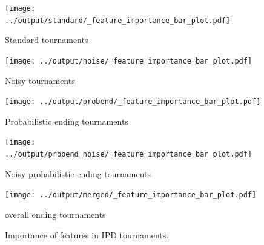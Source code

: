 \documentclass{article}
\begin{document}
\begin{figure}[!htbp]
    \begin{minipage}{0.5\textwidth}
        \begin{center}
            \texttt{[image: ../output/standard/\_feature\_importance\_bar\_plot.pdf]}
        \end{center}
        \caption{Standard tournaments}
    \end{minipage}\hspace{1cm}
    \begin{minipage}{0.5\textwidth}
        \begin{center}
            \texttt{[image: ../output/noise/\_feature\_importance\_bar\_plot.pdf]}
        \end{center}
        \caption{Noisy tournaments}
    \end{minipage}\hspace{1cm}
    \begin{minipage}{0.5\textwidth}
        \begin{center}
            \texttt{[image: ../output/probend/\_feature\_importance\_bar\_plot.pdf]}
        \end{center}
        \caption{Probabilistic ending tournaments}
    \end{minipage}\hspace{1cm}
    \begin{minipage}{0.5\textwidth}
        \begin{center}
            \texttt{[image: ../output/probend\_noise/\_feature\_importance\_bar\_plot.pdf]}
        \end{center}
        \caption{Noisy probabilistic ending tournaments}
    \end{minipage}
    \begin{minipage}{0.5\textwidth}
    \end{minipage}\hspace{4.5cm}
    \begin{minipage}{0.5\textwidth}
        \begin{center}
            \texttt{[image: ../output/merged/\_feature\_importance\_bar\_plot.pdf]}
        \end{center}
        \caption{overall ending tournaments}
    \end{minipage}
    \caption{Importance of features in IPD tournaments.}\label{fig:importance}
\end{figure}
\end{document}
